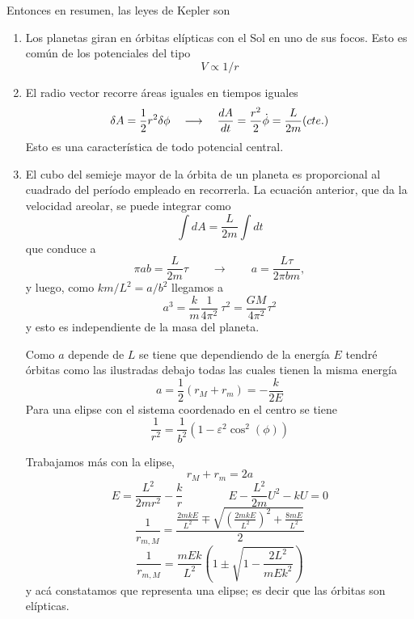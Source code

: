 \documentclass[10pt,oneside]{CBFT_book}
\begin{document}

Entonces en resumen, las leyes de Kepler son
\begin{enumerate}
 \item Los planetas giran en órbitas elípticas con el Sol en uno de sus focos. Esto es común de los potenciales del tipo 
	\[
		V \propto 1/r
	\]
 \item El radio vector recorre áreas iguales en tiempos iguales
	\[
		\delta A = \frac{1}{2} r^2 \delta \phi \quad \longrightarrow \quad \frac{d^{\hspace{-0.05em}} {A}}{d {t}^{\hspace{-0.05em}}} = \frac{r^2}{2} \dot{\phi} = \frac{L}{2m} (cte.)
	\]
	Esto es una característica de todo potencial central.
 \item El cubo del semieje mayor de la órbita de un planeta es proporcional al cuadrado del período empleado en recorrerla.
	La ecuación anterior, que da la velocidad areolar, se puede integrar como 
	\[
		\int dA  = \frac{L}{2m} \int dt
	\]
	que conduce a 
	\[
		\pi a b = \frac{L}{2m} \tau \qquad \longrightarrow \qquad a = \frac{L\tau}{2\pi b m}, 
	\]
	y luego, como $k m /L ^2 = a/b^2$ llegamos a 
	\[
		a^3 = \frac{k}{m} \frac{1}{4\pi^2} \: \tau^2 = \frac{GM}{4\pi^2} \tau^2
	\]
 y esto es independiente de la masa del planeta.
 
Como $a$ depende de $L$ se tiene que dependiendo de la energía $E$ tendré órbitas como las ilustradas debajo
todas las cuales tienen la misma energía 
\[
	a = \frac{1}{2}(r_M + r_m) = -\frac{k}{2E}
\] 
 Para una elipse con el sistema coordenado en el centro se tiene 
 \[
	\frac{1}{r^2} = \frac{1}{b^2}( 1-\varepsilon^2 \cos^2 (\phi) )
 \]
 
 Trabajamos más con la elipse,
 \[
	r_M + r_m = 2a
 \]
 \[
	E = \frac{L^2}{2mr^2} - \frac{k}{r}	\qquad\qquad E - \frac{L^2}{2m} U^2 - kU = 0
 \]
 \[
	\frac{1}{r_{m,M}} = \frac{ \frac{2mkE}{L^2} \mp \sqrt{ \left(\frac{2mkE}{L^2}\right)^2 + \frac{8mE}{L^2} } }{2}
 \]
 \[
	\frac{1}{r_{m,M}} = \frac{mEk}{L^2} \left( 1 \pm \sqrt{1 - \frac{2L^2}{mEk^2}}\right) 
 \]
 y acá constatamos que representa una elipse; es decir que las órbitas son elípticas.
\end{enumerate}
\end{document}
